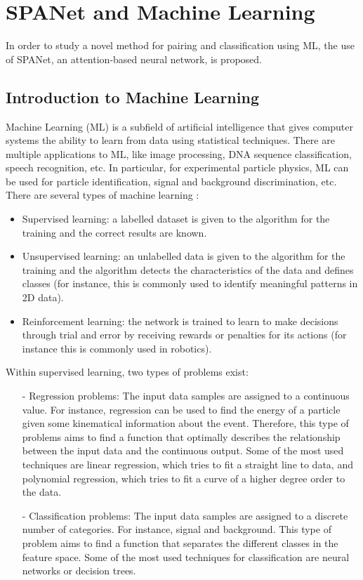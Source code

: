 \section{SPANet and Machine Learning} \label{section: spanet architecture}


In order to study a novel method for pairing and classification using ML, the use of SPANet, an attention-based neural network, is proposed.


\subsection{Introduction to Machine Learning}

Machine Learning (ML) is a subfield of artificial intelligence that gives computer systems the ability to learn from data using statistical techniques. There are multiple applications to ML, like image processing, DNA sequence classification, speech recognition, etc. In particular, for experimental particle physics, ML can be used for particle identification, signal and background discrimination, etc. There are several types of machine learning \cite{introml}:
\begin{itemize}
    \item Supervised learning: a labelled dataset is given to the algorithm for the training and the correct results are known.
   \item Unsupervised learning: an unlabelled data is given to the algorithm for the training and the algorithm detects the characteristics of the data and defines classes (for instance, this is commonly used to identify meaningful patterns in 2D data).
   \item Reinforcement learning: the network is trained to learn to make decisions through trial and error by receiving rewards or penalties for its actions (for instance this is commonly used in robotics).
\end{itemize}

\noindent Within supervised learning, two types of problems exist:
   \begin{itemize}
       \item [-] Regression problems: The input data samples are assigned to a continuous value. For instance, regression can be used to find the energy of a particle given some kinematical information about the event. Therefore, this type of problems aims to find a function that optimally describes the relationship between the input data and the continuous output. Some of the most used techniques are linear regression, which tries to fit a straight line to data, and polynomial regression, which tries to fit a curve of a higher degree order to the data.
       \item [-] Classification problems: The input data samples are assigned to a discrete number of categories. For instance, signal and background. This type of problem aims to find a function that separates the different classes in the feature space. Some of the most used techniques for classification are neural networks or decision trees.
   \end{itemize}

